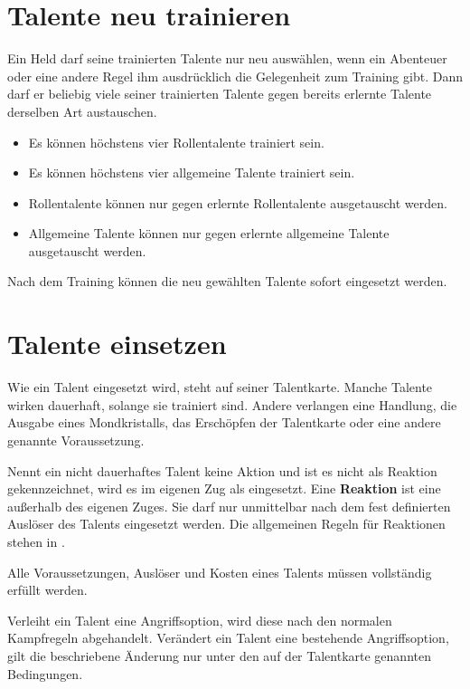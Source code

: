 \section{Talente neu trainieren}

Ein Held darf seine trainierten Talente nur neu auswählen, wenn ein Abenteuer oder eine andere Regel ihm ausdrücklich die Gelegenheit zum Training gibt. Dann darf er beliebig viele seiner trainierten Talente gegen bereits erlernte Talente derselben Art austauschen.

\begin{kurzregel}[title=Talente neu trainieren]
\begin{itemize}
  \item Es können höchstens vier Rollentalente trainiert sein.
  \item Es können höchstens vier allgemeine Talente trainiert sein.
  \item Rollentalente können nur gegen erlernte Rollentalente ausgetauscht werden.
  \item Allgemeine Talente können nur gegen erlernte allgemeine Talente ausgetauscht werden.
\end{itemize}
\end{kurzregel}

Nach dem Training können die neu gewählten Talente sofort eingesetzt werden.

\section{Talente einsetzen}

Wie ein Talent eingesetzt wird, steht auf seiner Talentkarte. Manche Talente wirken dauerhaft, solange sie trainiert sind. Andere verlangen eine Handlung, die Ausgabe eines Mondkristalls, das Erschöpfen der Talentkarte oder eine andere genannte Voraussetzung.

Nennt ein nicht dauerhaftes Talent keine Aktion und ist es nicht als Reaktion gekennzeichnet, wird es im eigenen Zug als \freeAction{} eingesetzt. Eine \textbf{Reaktion} ist eine \freeAction{} außerhalb des eigenen Zuges. Sie darf nur unmittelbar nach dem fest definierten Auslöser des Talents eingesetzt werden. Die allgemeinen Regeln für Reaktionen stehen in .

\begin{kurzregel}[title=Ein Talent einsetzen]
Alle Voraussetzungen, Auslöser und Kosten eines Talents müssen vollständig erfüllt werden.

Verleiht ein Talent eine Angriffsoption, wird diese nach den normalen Kampfregeln abgehandelt. Verändert ein Talent eine bestehende Angriffsoption, gilt die beschriebene Änderung nur unter den auf der Talentkarte genannten Bedingungen.
\end{kurzregel}

